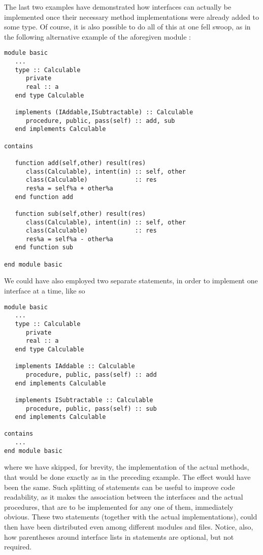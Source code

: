 \documentclass[11pt,oneside]{report}
\newcommand{\code}[1]{{\selectfont\ttfamily{#1}}}
\begin{document}
The last two examples have demonstrated how interfaces can actually be
implemented once their necessary method implementations were already
added to some type. Of course, it is also possible to do all of this
at one fell swoop, as in the following alternative example of the
aforegiven module \code{basic}:
\begin{lstlisting}[language=LFortran,style=boxed]
module basic
   ...
   type :: Calculable
      private
      real :: a
   end type Calculable

   implements (IAddable,ISubtractable) :: Calculable
      procedure, public, pass(self) :: add, sub
   end implements Calculable

contains

   function add(self,other) result(res)
      class(Calculable), intent(in) :: self, other
      class(Calculable)             :: res
      res%a = self%a + other%a
   end function add

   function sub(self,other) result(res)
      class(Calculable), intent(in) :: self, other
      class(Calculable)             :: res
      res%a = self%a - other%a
   end function sub

end module basic      
\end{lstlisting}
We could have also employed two separate \code{implements} statements, in
order to implement one interface at a time, like so
\begin{lstlisting}[language=LFortran,style=boxed]
module basic
   ...
   type :: Calculable
      private
      real :: a
   end type Calculable

   implements IAddable :: Calculable
      procedure, public, pass(self) :: add
   end implements Calculable

   implements ISubtractable :: Calculable
      procedure, public, pass(self) :: sub
   end implements Calculable
   
contains
   ...   
end module basic      
\end{lstlisting}
where we have skipped, for brevity, the implementation of the actual
methods, that would be done exactly as in the preceding example. The
effect would have been the same. Such splitting of \code{implements}
statements can be useful to improve code readability, as it makes the
association between the interfaces and the actual procedures, that are
to be implemented for any one of them, immediately obvious. These two
statements (together with the actual implementations), could then have
been distributed even among different modules and files. Notice, also,
how parentheses around interface lists in \code{implements} statements
are optional, but not required.
\end{document}
